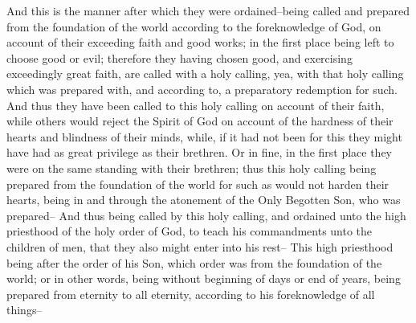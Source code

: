 And this is the manner after which they were ordained--being called and prepared from the foundation of the world according to the foreknowledge of God, on account of their exceeding faith and good works; in the first place being left to choose good or evil; therefore they having chosen good, and exercising exceedingly great faith, are called with a holy calling, yea, with that holy calling which was prepared with, and according to, a preparatory redemption for such.
\bverse \iffalse And thus they have been called to this holy calling on account of their faith, while others would reject the Spirit of God on account of the hardness of their hearts and blindness of their minds, while, if it had not been for this they might have had as great privilege as their brethren. \fi
And thus they have been called to this holy calling on account of their faith, while others would reject the Spirit of God on account of the hardness of their hearts and blindness of their minds, while, if it had not been for this they might have had as great privilege as their brethren.
\bverse \iffalse Or in fine, in the first place they were on the same standing with their brethren; thus this holy calling being prepared from the foundation of the world for such as would not harden their hearts, being in and through the atonement of the Only Begotten Son, who was prepared-- \fi
Or in fine, in the first place they were on the same standing with their brethren; thus this holy calling being prepared from the foundation of the world for such as would not harden their hearts, being in and through the atonement of the Only Begotten Son, who was prepared--
\bverse \iffalse And thus being called by this holy calling, and ordained unto the high priesthood of the holy order of God, to teach his commandments unto the children of men, that they also might enter into his rest-- \fi
And thus being called by this holy calling, and ordained unto the high priesthood of the holy order of God, to teach his commandments unto the children of men, that they also might enter into his rest--
\bverse \iffalse This high priesthood being after the order of his Son, which order was from the foundation of the world; or in other words, being without beginning of days or end of years, being prepared from eternity to all eternity, according to his foreknowledge of all things-- \fi
This high priesthood being after the order of his Son, which order was from the foundation of the world; or in other words, being without beginning of days or end of years, being prepared from eternity to all eternity, according to his foreknowledge of all things--
